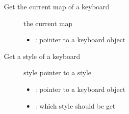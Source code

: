 \documentclass[letterpaper,10pt,english]{sphinxmanual}
\begin{document}

\begin{fulllineitems}
\label{\detokenize{object-types/kb:_CPPv419lv_kb_get_map_arrayPK8lv_obj_t}}%
\pysigstartmultiline
{}\label{\detokenize{object-types/kb:lv__kb_8h_1acd17d7fcedf2442df35adf14d82065c6}}%
\pysigstopmultiline
Get the current map of a keyboard \begin{description}
\item[{}] \leavevmode
the current map 

\item[{}] \leavevmode\begin{itemize}
\item {} 
: pointer to a keyboard object 

\end{itemize}

\end{description}


\end{fulllineitems}


\begin{fulllineitems}
\label{\detokenize{object-types/kb:_CPPv415lv_kb_get_stylePK8lv_obj_t13lv_kb_style_t}}%
\pysigstartmultiline
{}\label{\detokenize{object-types/kb:lv__kb_8h_1a808f2c7fbf048e7bd96c3d608737241f}}%
\pysigstopmultiline
Get a style of a keyboard \begin{description}
\item[{}] \leavevmode
style pointer to a style 

\item[{}] \leavevmode\begin{itemize}
\item {} 
: pointer to a keyboard object 

\item {} 
: which style should be get 

\end{itemize}

\end{description}


\end{fulllineitems}
\end{document}
